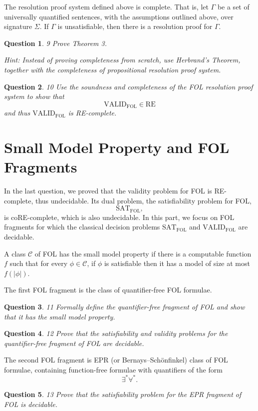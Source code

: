 \documentclass{article}
\newtheorem{theorem}{Theorem}[section]
\newtheorem{definition}[theorem]{Definition}
\newtheorem{question}[theorem]{Question}
\let\olddefinition\definition
\let\endolddefinition\enddefinition
\renewenvironment{definition}
  {\begin{tcolorbox}[
      colback=red!10,
      colframe=red!50!black,
      boxrule=0.6pt,
      arc=2pt,
      left=6pt,right=6pt,top=4pt,bottom=4pt,
      breakable
    ]\olddefinition}
  {\endolddefinition\end{tcolorbox}}
\let\oldtheorem\theorem
\let\endoldtheorem\endtheorem
\renewenvironment{theorem}
  {\begin{tcolorbox}[
      colback=yellow!6,
      colframe=yellow!60!black,
      boxrule=0.6pt,
      arc=2pt,
      left=6pt,right=6pt,top=4pt,bottom=4pt,
      parbox=false
    ]\oldtheorem}
  {\endoldtheorem\end{tcolorbox}}
\begin{document}
\begin{theorem}
The resolution proof system defined above is complete. That is, let $\Gamma$ be a set of universally quantified sentences, with the assumptions outlined above, over signature $\Sigma$. If $\Gamma$ is unsatisfiable, then there is a resolution proof for $\Gamma$.
\end{theorem}

\begin{question}{9}
Prove Theorem 3.

\emph{Hint:} Instead of proving completeness from scratch, use Herbrand's Theorem, together with the completeness of propositional resolution proof system.
\end{question}

\begin{question}{10}
Use the soundness and completeness of the FOL resolution proof system to show that
\[
\mathrm{VALID}_{\mathrm{FOL}} \in \mathrm{RE}
\]
and thus $\mathrm{VALID}_{\mathrm{FOL}}$ is RE-complete.
\end{question}

\section*{Small Model Property and FOL Fragments}

In the last question, we proved that the validity problem for FOL is RE-complete, thus undecidable. Its dual problem, the satisfiability problem for FOL,
\[
\mathrm{SAT}_{\mathrm{FOL}},
\]
is coRE-complete, which is also undecidable. In this part, we focus on FOL fragments for which the classical decision problems $\mathrm{SAT}_{\mathrm{FOL}}$ and $\mathrm{VALID}_{\mathrm{FOL}}$ are decidable.

\begin{definition}[Small Model Property]
A class $\mathcal{C}$ of FOL has the small model property if there is a computable function $f$ such that for every $\phi \in \mathcal{C}$, if $\phi$ is satisfiable then it has a model of size at most $f(|\phi|)$.
\end{definition}

The first FOL fragment is the class of quantifier-free FOL formulae.

\begin{question}{11}
Formally define the quantifier-free fragment of FOL and show that it has the small model property.
\end{question}

\begin{question}{12}
Prove that the satisfiability and validity problems for the quantifier-free fragment of FOL are decidable.
\end{question}

The second FOL fragment is EPR (or Bernays--Sch\"onfinkel) class of FOL formulae, containing function-free formulae with quantifiers of the form
\[
\exists^* \forall^*.
\]

\begin{question}{13}
Prove that the satisfiability problem for the EPR fragment of FOL is decidable.
\end{question}
\end{document}
